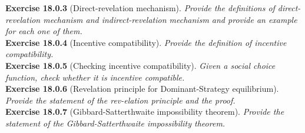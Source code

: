 \textbf{Exercise 18.0.3} (Direct-revelation mechanism). \textit{Provide the definitions of direct-revelation mechanism and indirect-revelation mechanism and provide an example for each one of them.}\\

\textbf{Exercise 18.0.4} (Incentive compatibility). \textit{Provide the definition of incentive compatibility.}\\

\textbf{Exercise 18.0.5} (Checking incentive compatibility). \textit{Given a social choice function, check whether it is incentive compatible.}\\

\textbf{Exercise 18.0.6} (Revelation principle for Dominant-Strategy equilibrium). \textit{Provide the statement of the rev-elation principle and the proof.}\\

\textbf{Exercise 18.0.7} (Gibbard-Satterthwaite impossibility theorem). \textit{Provide the statement of the Gibbard-Satterthwaite impossibility theorem.}\\